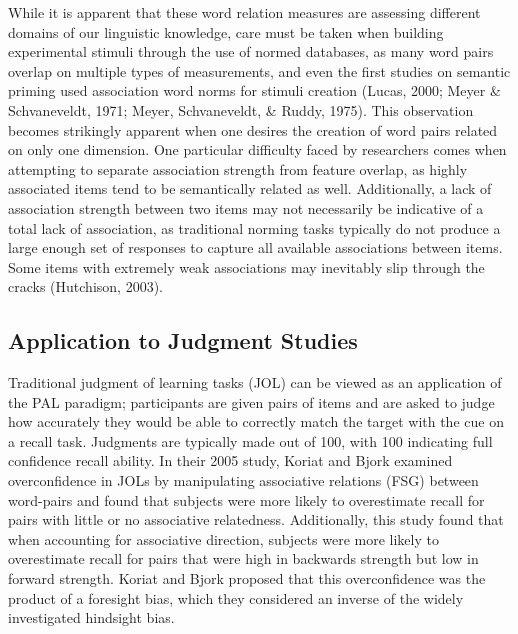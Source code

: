 \documentclass[english,man]{apa6}
\theoremstyle{definition}
\theoremstyle{definition}
\theoremstyle{definition}
\theoremstyle{remark}
\begin{document}
While it is apparent that these word relation measures are assessing
different domains of our linguistic knowledge, care must be taken when
building experimental stimuli through the use of normed databases, as
many word pairs overlap on multiple types of measurements, and even the
first studies on semantic priming used association word norms for
stimuli creation (Lucas, 2000; Meyer \& Schvaneveldt, 1971; Meyer,
Schvaneveldt, \& Ruddy, 1975). This observation becomes strikingly
apparent when one desires the creation of word pairs related on only one
dimension. One particular difficulty faced by researchers comes when
attempting to separate association strength from feature overlap, as
highly associated items tend to be semantically related as well.
Additionally, a lack of association strength between two items may not
necessarily be indicative of a total lack of association, as traditional
norming tasks typically do not produce a large enough set of responses
to capture all available associations between items. Some items with
extremely weak associations may inevitably slip through the cracks
(Hutchison, 2003).

\subsection{Application to Judgment
Studies}\label{application-to-judgment-studies}

Traditional judgment of learning tasks (JOL) can be viewed as an
application of the PAL paradigm; participants are given pairs of items
and are asked to judge how accurately they would be able to correctly
match the target with the cue on a recall task. Judgments are typically
made out of 100, with 100 indicating full confidence recall ability. In
their 2005 study, Koriat and Bjork examined overconfidence in JOLs by
manipulating associative relations (FSG) between word-pairs and found
that subjects were more likely to overestimate recall for pairs with
little or no associative relatedness. Additionally, this study found
that when accounting for associative direction, subjects were more
likely to overestimate recall for pairs that were high in backwards
strength but low in forward strength. Koriat and Bjork proposed that
this overconfidence was the product of a foresight bias, which they
considered an inverse of the widely investigated hindsight bias.
\end{document}
